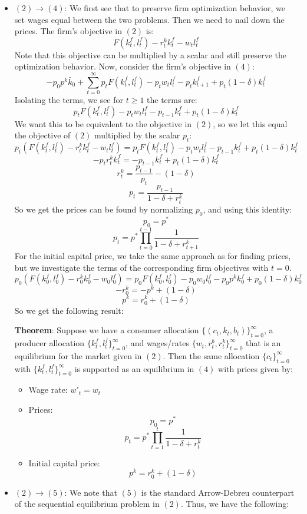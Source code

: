 \documentclass[10pt,letter]{article}
\begin{document}
\begin{itemize}
\item $(2) \to (4)$: We first see that to preserve firm optimization behavior, we set wages equal between the two problems. Then we need to nail down the prices. The firm's objective in $(2)$ is:
\[ F(k_t^f, l_t^f) - r_t^k k_t^f - w_tl_t^f \]
Note that this objective can be multiplied by a scalar and still preserve the optimization behavior. Now, consider the firm's objective in $(4)$:
\[-p_0 p^k \bar{k}_0 + \sum_{t=0}^\infty p_t F(k_t^f, l_t^f) - p_tw_tl_t^f - p_tk^f_{t+1} + p_t(1-\delta)k^f_t \]
Isolating the terms, we see for $t \ge 1$ the terms are:
\[p_t F(k_t^f, l_t^f) - p_tw_tl_t^f - p_{t-1}k^f_{t} + p_t(1-\delta)k^f_t\]
We want this to be equivalent to the objective in $(2)$, so we let this equal the objective of $(2)$ multiplied by the scalar $p_t$:
\[ p_t(F(k_t^f, l_t^f) - r_t^k k_t^f - w_tl_t^f) = p_t F(k_t^f, l_t^f) - p_tw_tl_t^f - p_{t-1}k^f_{t} + p_t(1-\delta)k^f_t \]
\[ -p_tr_t^kk_t^f = - p_{t-1}k_t^f + p_t(1-\delta)k^f_t \]
\[ r_t^k = \frac{p_{t-1}}{p_t} - (1-\delta) \]
\[ p_t = \frac{p_{t-1}}{1 - \delta + r_t^k} \]
So we get the prices can be found by normalizing $p_0$, and using this identity:
\[ p_0 = p^* \]
\[ p_t = p^* \prod_{t=0}^{t-1} \frac{1}{1-\delta + r_{t+1}^k}\]
For the initial capital price, we take the same approach as for finding prices, but we investigate the terms of the corresponding firm objectives with $t=0$.
\[ p_0(F(k_0^f, l_0^f) - r_0^k k_0^f - w_0l_0^f) = p_0 F(k_0^f, l_0^f) - p_0w_0l_0^f - p_0 p^k k^f_{0} + p_0(1-\delta)k^f_0 \]
\[ - r_0^k  =  - p^k + (1-\delta) \]
\[ p^k = r_0^k + (1-\delta) \]
So we get the following result:

\textbf{Theorem}: Suppose we have a consumer allocation $\{ (c_t, k_t, b_t) \}_{t=0}^\infty$, a producer allocation $\{ k_t^f, l_t^f \}_{t=0}^\infty$, and wages/rates $\{ w_t, r_t^b, r_t^k \}_{t=0}^\infty$ that is an equilibrium for the market given in $(2)$. Then the same allocation $\{ c_t \}_{t=0}^\infty$  with $\{ k_t^f, l_t^f \}_{t=0}^\infty$ is supported as an equilibrium in $(4)$ with prices given by:
\begin{itemize}
\item Wage rate: $w'_t = w_t$
\item Prices:
\[ p_0 = p^* \]
\[ p_t = p^* \prod_{t=1}^{t} \frac{1}{1-\delta + r_{t}^k}\]
\item Initial capital price:
\[ p^k = r_0^k + (1-\delta) \]
\end{itemize}
\item $(2) \to (5)$: We note that $(5)$ is the standard Arrow-Debreu counterpart of the sequential equilibrium problem in $(2)$. Thus, we have the following:


\end{itemize}
\end{document}
